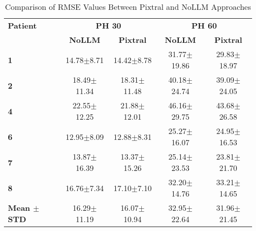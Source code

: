 \begin{table}%
\caption{Comparison of RMSE Values Between Pixtral and NoLLM Approaches}
\label{tab:rmse_comparison}
\renewcommand{\arraystretch}{1.3}
\begin{tabular}{|l|cc|cc|}
\hline
\rowcolor{gray!20} \textbf{Patient} & \multicolumn{2}{c|}{\textbf{PH 30}} & \multicolumn{2}{c|}{\textbf{PH 60}} \\
\rowcolor{gray!20} & \textbf{NoLLM} & \textbf{Pixtral} & \textbf{NoLLM} & \textbf{Pixtral} \\
\hline
\rowcolor{gray!10}
\textbf{1} & 14.78$\pm$8.71 & 14.42$\pm$8.78 & 31.77$\pm$19.86 & 29.83$\pm$18.97 \\
\hline
\textbf{2} & 18.49$\pm$11.34 & 18.31$\pm$11.48 & 40.18$\pm$24.74 & 39.09$\pm$24.05 \\
\hline
\rowcolor{gray!10}
\textbf{4} & 22.55$\pm$12.25 & 21.88$\pm$12.01 & 46.16$\pm$29.75 & 43.68$\pm$26.58 \\
\hline
\textbf{6} & 12.95$\pm$8.09 & 12.88$\pm$8.31 & 25.27$\pm$16.07 & 24.95$\pm$16.53 \\
\hline
\rowcolor{gray!10}
\textbf{7} & 13.87$\pm$16.39 & 13.37$\pm$15.26 & 25.14$\pm$23.53 & 23.81$\pm$21.70 \\
\hline
\textbf{8} & 16.76$\pm$7.34 & 17.10$\pm$7.10 & 32.20$\pm$14.76 & 33.21$\pm$14.65 \\
\hline
\rowcolor{gray!20}
\textbf{Mean $\pm$ STD} & 16.29$\pm$11.19 & 16.07$\pm$10.94 & 32.95$\pm$22.64 & 31.96$\pm$21.45 \\
\hline
\end{tabular}
\end{table}
